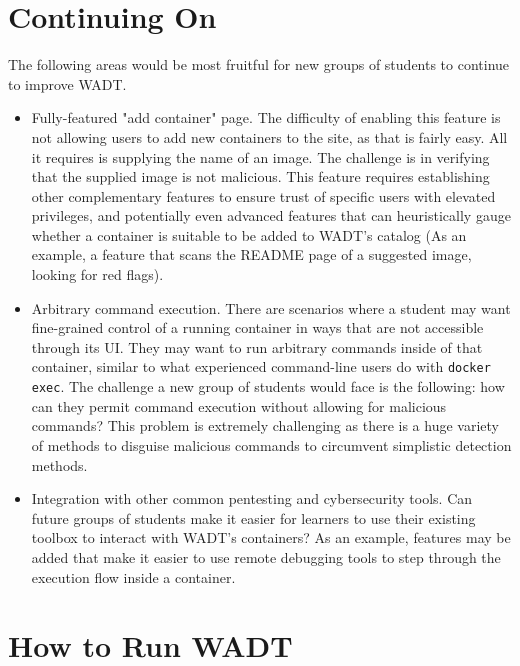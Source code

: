 \documentclass[12pt,titlepage]{article}
\begin{document}
\section{Continuing On}
The following areas would be most fruitful for new groups of students to continue to improve WADT.
\begin{itemize}
	\item Fully-featured "add container" page. The difficulty of enabling this feature is not
		allowing users to add new containers to the site, as that is fairly easy. All it requires
		is supplying the name of an image. The challenge is in verifying that the supplied image
		is not malicious. This feature requires establishing other complementary features to ensure
		trust of specific users with elevated privileges, and potentially even advanced features
		that can heuristically gauge whether a container is suitable to be added to WADT's catalog
		(As an example, a feature that scans the README page of a suggested image, looking for red flags).
	\item Arbitrary command execution. There are scenarios where a student may want fine-grained control of a
		running container in ways that are not accessible through its UI. They may want to run arbitrary
		commands inside of that container, similar to what experienced command-line users do with \texttt{docker exec}.
		The challenge a new group of students would face is the following: how can they permit command execution
		without allowing for malicious commands? This problem is extremely challenging as there is a huge variety
		of methods to disguise malicious commands to circumvent simplistic detection methods.
	\item Integration with other common pentesting and cybersecurity tools. Can future groups of students make
		it easier for learners to use their existing toolbox to interact with WADT's containers? As an example,
		features may be added that make it easier to use remote debugging tools to step through the execution flow
		inside a container.
\end{itemize}

\section{How to Run WADT}
\end{document}
